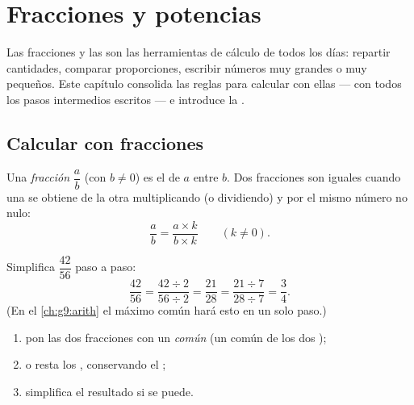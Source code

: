 \chapter{Fracciones y potencias}\label{ch:g9:fractions}

Las fracciones y las  son las herramientas de cálculo de todos los días: repartir
cantidades, comparar proporciones, escribir números muy grandes o muy
pequeños. Este capítulo consolida las reglas para calcular con ellas ---
con todos los pasos intermedios escritos --- e introduce la .

\section{Calcular con fracciones}

\begin{definition}[Fracción]\label{def:g9:fractions:fraction}
Una \emph{fracción} $\dfrac ab$ (con $b \neq 0$) es el
 de $a$ entre $b$. Dos fracciones son iguales cuando una se obtiene de
la otra multiplicando (o dividiendo)  y  por el
mismo número no nulo:
\[
\frac ab = \frac{a \times k}{b \times k} \qquad (k \neq 0).
\]
\end{definition}

\begin{example}\label{ex:g9:fractions:simplify}
Simplifica $\dfrac{42}{56}$ paso a paso:
\[
\frac{42}{56} = \frac{42 \div 2}{56 \div 2} = \frac{21}{28}
= \frac{21 \div 7}{28 \div 7} = \frac34 .
\]
(En el \cref{ch:g9:arith} el máximo común  hará esto en un solo
paso.)
\end{example}

\begin{method}\label{met:g9:fractions:add}
\begin{enumerate}
  \item pon las dos fracciones con un \emph{ común} (un
         común de los dos );
  \item {} o resta los , conservando el ;
  \item simplifica el resultado si se puede.
\end{enumerate}
\end{method}

